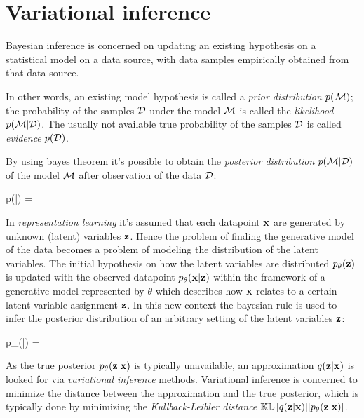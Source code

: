\section{Variational inference}

Bayesian inference is concerned on updating an existing hypothesis on a statistical model
on a data source, with data samples empirically obtained from that data source.

In other words, an existing model hypothesis is called a \emph{prior distribution} $p(\mathcal{M})$; 
the probability of the samples $\mathcal{D}$ under the model $\mathcal{M}$ is called the \emph{likelihood} $p(\mathcal{M}|\mathcal{D})$. The usually not available true probability of the samples $\mathcal{D}$ is called \emph{evidence} $p(\mathcal{D})$.

By using bayes theorem it's possible to obtain the \emph{posterior distribution} $p(\mathcal{M}|\mathcal{D})$ of the model $\mathcal{M}$ after observation of the data $\mathcal{D}$:

\begin{nalign}
p(\model|\dataset) = 
\end{nalign}

In \emph{representation learning} it's assumed that each datapoint $\mathbf{x}$
are generated by unknown (latent) variables $\mathbf{z}$. Hence the problem
of finding the generative model of the data becomes
a problem of modeling the distribution of the latent variables.
The initial hypothesis on how the latent variables are distributed $p_\theta(\mathbf{z})$
is updated with the observed datapoint $p_\theta(\mathbf{x}|\mathbf{z})$
within the framework of a generative model represented by $\theta$
which describes how $\mathbf{x}$ relates to a certain latent variable assignment $\mathbf{z}$.
In this new context the bayesian rule is used to infer the posterior distribution
of an arbitrary setting of the latent variables $\mathbf{z}$:

\begin{nalign}
p_\theta(\boldz|\boldx) = 
\end{nalign}

As the true posterior $p_\theta(\mathbf{z}|\mathbf{x})$ is typically unavailable,
an approximation $q(\mathbf{z}|\mathbf{x})$ is looked for
via \emph{variational inference} methods.
Variational inference is concerned to
minimize the distance between the approximation and the true posterior\cite{Fox2012},
which is typically done by minimizing the \emph{Kullback-Leibler distance}
$\mathbb{KL}\left[ q(\mathbf{z}|\mathbf{x}) || p_\theta(\mathbf{z}|\mathbf{x}) \right]$.

